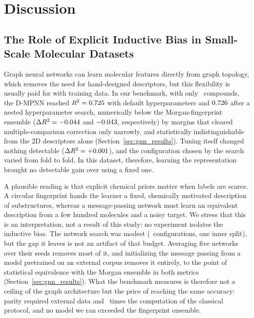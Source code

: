 \section{Discussion}
\label{sec:discussion}


\subsection{The Role of Explicit Inductive Bias in Small-Scale Molecular Datasets}

Graph neural networks can learn molecular features directly from graph topology, which removes the need for hand-designed descriptors, but this flexibility is usually paid for with training data. In our benchmark, with only \NCompounds\ compounds, the D-MPNN reached $R^2 = 0.725$ with default hyperparameters and $0.726$ after a nested hyperparameter search, numerically below the Morgan-fingerprint ensemble ($\Delta R^2 = -0.044$ and $-0.043$, respectively) by margins that cleared multiple-comparison correction only narrowly, and statistically indistinguishable from the 2D descriptors alone (Section~\ref{sec:gnn_results}). Tuning itself changed nothing detectable ($\Delta R^2 = +0.001$), and the configuration chosen by the search varied from fold to fold. In this dataset, therefore, learning the representation brought no detectable gain over using a fixed one.

A plausible reading is that explicit chemical priors matter when labels are scarce. A circular fingerprint hands the learner a fixed, chemically motivated description of substructures, whereas a message-passing network must learn an equivalent description from a few hundred molecules and a noisy target. We stress that this is an interpretation, not a result of this study: no experiment isolates the inductive bias. The network search was modest (\GnnTunedNConfigs\ configurations, one inner split), but the gap it leaves is not an artifact of that budget. Averaging five networks over their seeds removes most of it, and initializing the message passing from a model pretrained on an external corpus removes it entirely, to the point of statistical equivalence with the Morgan ensemble in both metrics (Section~\ref{sec:gnn_results}). What the benchmark measures is therefore not a ceiling of the graph architecture but the price of reaching the same accuracy: parity required external data and \ChemeleonCostFactor\ times the computation of the classical protocol, and no model we ran exceeded the fingerprint ensemble.

